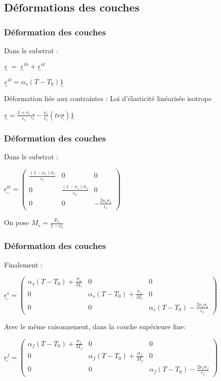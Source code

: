 \subsection{Déformations des couches} 
\begin{frame}
    \frametitle{Déformation des couches}
        \item Dans le substrat :
        \item $\underset{\sim}{\epsilon}~=~\underset{\sim}{\epsilon}^{th} + \underset{\sim}{\epsilon}^{él}$
        \item $\underset{\sim}{\epsilon}^{él}= \alpha_s(T-T_0)\underset{\sim}{1}$
        \item Déformation liée aux contraintes : Loi d'élasticité linéarisée isotrope
        \item $\underset{\sim}{\epsilon}=\frac{1+\nu_s}{\epsilon_s}\underset{\sim}{\sigma}-\frac{\nu_s}{\epsilon_s}(tr\underset{\sim}{\sigma})\underset{\sim}{1}$
\end{frame}   

\begin{frame}
    \frametitle{Déformation des couches}
        \item Dans le substrat :
        \item $\underset{\sim}{\epsilon^{él}}=\begin{pmatrix}\frac{(1-\nu_s)\sigma_s}{\epsilon_s}&0&0\\0&\frac{(1-\nu_s)\sigma_s}{\epsilon_s}&0\\0&0&-\frac{2\nu_s\sigma_s}{\epsilon_s}\end{pmatrix}$
        \item On pose $M_s = \frac{E_s}{1-\nu_s}$
        
\end{frame}  

\begin{frame}
    \frametitle{Déformation des couches}
        \item Finalement :
        \item $\underset{\sim}{\epsilon^s}=\begin{pmatrix}\alpha_s(T-T_0)+\frac{\sigma_s}{M_s}&0&0\\0&\alpha_s(T-T_0)+\frac{\sigma_s}{M_s}&0\\0&0&\alpha_s(T-T_0)-\frac{2\nu_s\sigma_s}{\epsilon_s}\end{pmatrix}$
        \item Avec le même raisonnement, dans la couche supérieure fine:
        \item $\underset{\sim}{\epsilon^f}=\begin{pmatrix}\alpha_f(T-T_0)+\frac{\sigma_f}{M_f}&0&0\\0&\alpha_f(T-T_0)+\frac{\sigma_f}{M_f}&0\\0&0&\alpha_f(T-T_0)-\frac{2\nu_s\sigma_f}{\epsilon_f}\end{pmatrix}$
        
\end{frame} 

